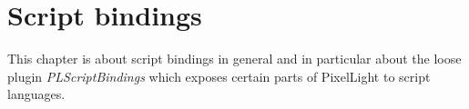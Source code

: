 \chapter{Script bindings}
This chapter is about script bindings in general and in particular about the loose plugin \emph{PLScriptBindings} which exposes certain parts of PixelLight to script languages.
